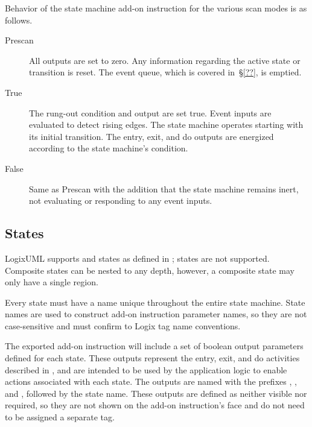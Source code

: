 Behavior of the state machine add-on instruction for the various scan
modes is as follows.

\begin{description}
  \item[Prescan] All outputs are set to zero. Any information regarding
    the active state or transition is reset. The event queue, which is
    covered in~\S\ref{??}, is emptied.

  \item[True] The rung-out condition and  output are set
    true. Event inputs are evaluated to detect rising edges. The state machine
    operates starting with its initial transition. The entry, exit, and
    do outputs are energized according to the state machine's condition.

  \item[False] Same as Prescan with the addition that the state machine
    remains inert, not evaluating or responding to any event inputs.
\end{description}


\subsection{States}
\label{ss:states}

LogixUML supports  and
 states as defined in
\textcite[\S14.2.3.4.1]{OMGUML};  states are
not supported. Composite states can be nested to any depth, however, a
composite state may only have a single region.

Every state must have a name unique throughout the entire state
machine. State names are used to construct add-on instruction parameter names,
so they are not case-sensitive and must confirm to Logix tag name
conventions.

The exported add-on instruction will include a set of boolean output parameters
defined for each state. These outputs represent the entry, exit, and do
activities described in \textcite[\S14.2.3.4.3]{OMGUML}, and are intended to
be used by the application logic to enable actions associated with each
state. The outputs are named with the prefixes
, , and
, followed by the state name. These outputs are defined
as neither visible nor required, so they are not shown on the add-on
instruction's face and do not need to be assigned a separate tag.


